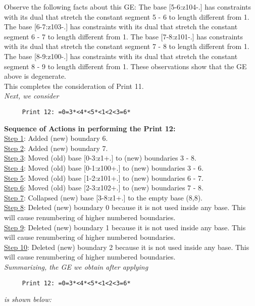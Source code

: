 \documentclass[final]{article}
\begin{document}
Observe the following facts about this GE:
The base [5-6:z104-.]  has constraints with its dual that stretch the constant segment 5 - 6 to length different from 1.  The base [6-7:z103-.]  has constraints with its dual that stretch the constant segment 6 - 7 to length different from 1.  The base [7-8:z101-.]  has constraints with its dual that stretch the constant segment 7 - 8 to length different from 1.  The base [8-9:z100-.]  has constraints with its dual that stretch the constant segment 8 - 9 to length different from 1.  These observations show that the GE above is degenerate.\\[0.1in]
This completes the consideration of Print 11.\\[0.1in]
{\em Next, we consider}
\begin{verbatim}
     Print 12: =0=3*<4*<5*<1<2<3=6*
\end{verbatim}
{\bf Sequence of Actions in performing the Print 12:}\\
{\underline{Step 1}:} Added (new) boundary 6.\\
{\underline{Step 2}:} Added (new) boundary 7.\\
{\underline{Step 3}:} Moved (old) base [0-3:z1+.]  to (new) boundaries 3 - 8.\\
{\underline{Step 4}:} Moved (old) base [0-1:z100+.]  to (new) boundaries 3 - 6.\\
{\underline{Step 5}:} Moved (old) base [1-2:z101+.]  to (new) boundaries 6 - 7.\\
{\underline{Step 6}:} Moved (old) base [2-3:z102+.]  to (new) boundaries 7 - 8.\\
{\underline{Step 7}:} Collapsed (new) base [3-8:z1+.]  to the empty base (8,8).
\\
{\underline{Step 8}:} Deleted (new) boundary 0 because it is not used inside any base.  This will cause renumbering of higher numbered boundaries.
\\
{\underline{Step 9}:} Deleted (new) boundary 1 because it is not used inside any base.  This will cause renumbering of higher numbered boundaries.
\\
{\underline{Step 10}:} Deleted (new) boundary 2 because it is not used inside any base.  This will cause renumbering of higher numbered boundaries.
\\[0.1in]
{\em Summarizing, the GE we obtain after applying}
\begin{verbatim}
     Print 12: =0=3*<4*<5*<1<2<3=6*
\end{verbatim}
{\em is shown below:}
\end{document}
